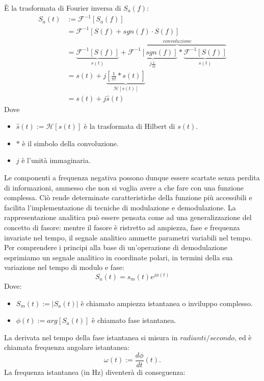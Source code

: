 \documentclass[12pt,a4paper, twoside, openright]{report}
\begin{document}
È la trasformata di Fourier inversa di $S_a(f)$:
\begin{align}
	S_a(t)&:= \mathcal{F}^{-1}[S_a(f)] \\
	&= \mathcal{F}^{-1}[S(f)+sgn(f) \cdot S(f)] \\
	&=\underbrace{\mathcal{F}^{-1}[S(f)]}_{s(t)} + \overbrace{ \underbrace{\mathcal{F}			^{-1} [sgn(f)]}_{j\frac{1}{\pi t}} * \underbrace{\mathcal{F}^{-1}[S(f)]}_{s(t)} }			^{convoluzione} \\
	&=s(t)+j \underbrace{[\frac{1}{\pi t}*s(t)]}_{\mathcal{H}[s(t)]} \\
	&=s(t) + j\hat{s}(t)
\end{align}
Dove
\begin{itemize}
	\item $\hat{s}(t):=\mathcal{H}[s(t)]$ è la trasformata di Hilbert di $s(t)$.
	\item $*$ è il simbolo della convoluzione.
	\item $j$ è l’unità immaginaria.
\end{itemize}
Le componenti a frequenza negativa possono dunque essere scartate senza perdita di informazioni, ammesso che non si voglia avere a che fare con una funzione complessa.
Ciò rende determinate caratteristiche della funzione più accessibili e facilita l'implementazione di tecniche di modulazione e demodulazione.
La rappresentazione analitica può essere pensata come ad una generalizzazione del concetto di fasore: mentre il fasore è ristretto ad ampiezza, fase e frequenza invariate nel tempo, il segnale analitico ammette parametri variabili nel tempo.
Per comprendere i principi alla base di un'operazione di demodulazione esprimiamo un segnale analitico in coordinate polari, in termini della sua variazione nel tempo di modulo e fase:
\begin{equation}
	S_a(t)=s_m(t)e^{j \phi (t)}
\end{equation}
Dove:
\begin{itemize}
	\item $S_m(t):= |S_a(t)|$ è chiamato ampiezza istantanea o inviluppo complesso.
	\item $\phi (t):= arg[S_a(t)]$ è chiamato fase istantanea.
\end{itemize}
La derivata nel tempo della fase istantanea si misura in $radianti/secondo$, ed è chiamata frequenza angolare istantanea:
\begin{equation}
	\omega (t):= \frac{d \phi}{dt} (t).
\end{equation}
La frequenza istantanea (in Hz) diventerà di conseguenza:
\end{document}
